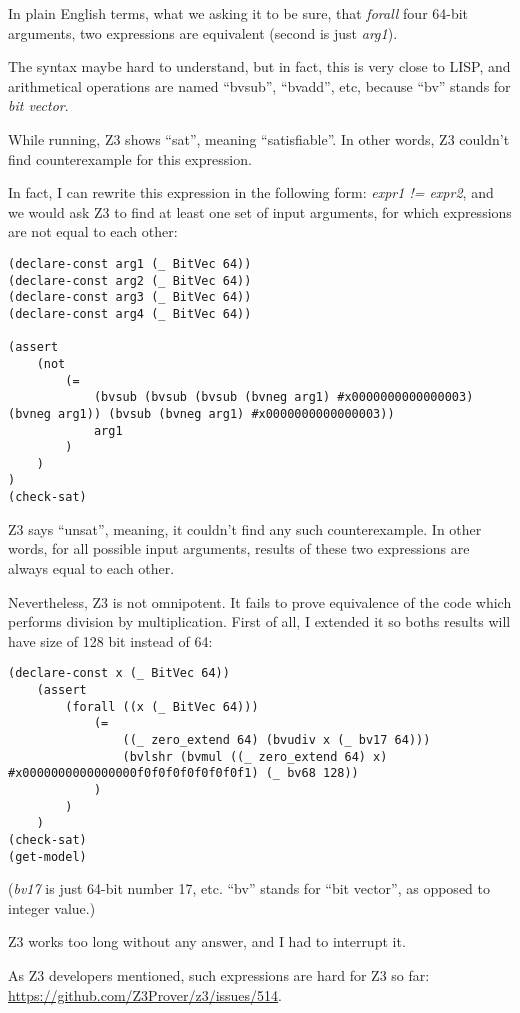 In plain English terms, what we asking it to be sure, that \textit{forall} four 64-bit arguments, two expressions
are equivalent (second is just \textit{arg1}).

The syntax maybe hard to understand, but in fact, this is very close to LISP, and arithmetical operations
are named ``bvsub'', ``bvadd'', etc, because ``bv'' stands for \textit{bit vector}.

While running, Z3 shows ``sat'', meaning ``satisfiable''.
In other words, Z3 couldn't find counterexample for this expression.

In fact, I can rewrite this expression in the following form: \textit{expr1 != expr2}, and we would ask
Z3 to find at least one set of input arguments, for which expressions are not equal to each other:

\begin{lstlisting}
(declare-const arg1 (_ BitVec 64))
(declare-const arg2 (_ BitVec 64))
(declare-const arg3 (_ BitVec 64))
(declare-const arg4 (_ BitVec 64))

(assert
    (not
        (=
            (bvsub (bvsub (bvsub (bvneg arg1) #x0000000000000003) (bvneg arg1)) (bvsub (bvneg arg1) #x0000000000000003))
            arg1
        )
    )
)
(check-sat)
\end{lstlisting}

Z3 says ``unsat'', meaning, it couldn't find any such counterexample.
In other words, for all possible input arguments, results of these two expressions are always equal to each other.

Nevertheless, Z3 is not omnipotent.
It fails to prove equivalence of the code which performs division by multiplication.
First of all, I extended it so boths results will have size of 128 bit instead of 64:

\begin{lstlisting}
(declare-const x (_ BitVec 64))
    (assert
        (forall ((x (_ BitVec 64)))
            (=
                ((_ zero_extend 64) (bvudiv x (_ bv17 64)))
                (bvlshr (bvmul ((_ zero_extend 64) x) #x0000000000000000f0f0f0f0f0f0f0f1) (_ bv68 128))
            )
        )
    )
(check-sat)
(get-model)
\end{lstlisting}

(\textit{bv17} is just 64-bit number 17, etc. ``bv'' stands for ``bit vector'', as opposed to integer value.)

Z3 works too long without any answer, and I had to interrupt it.

As Z3 developers mentioned, such expressions are hard for Z3 so far:
\url{https://github.com/Z3Prover/z3/issues/514}.

